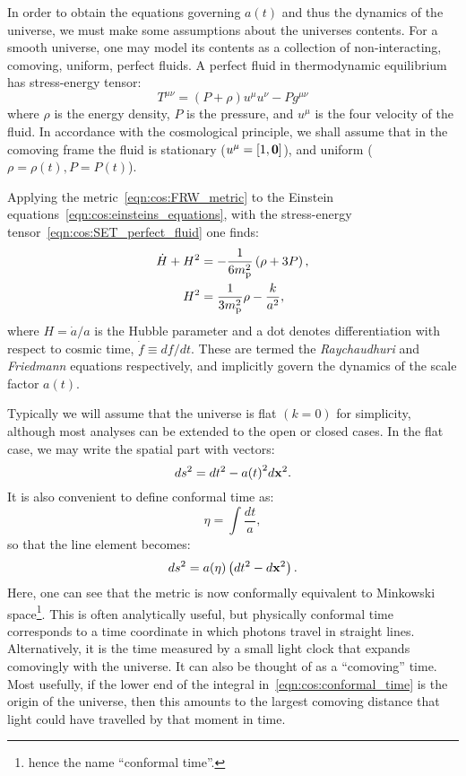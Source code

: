 In order to obtain the equations governing $a(t)$ and thus the dynamics of the universe, we must make some assumptions about the universes contents. For a smooth universe, one may model its contents as a collection of non-interacting, comoving, uniform, perfect fluids. A perfect fluid in thermodynamic equilibrium has stress-energy tensor:
\begin{equation}
  T^{\mu\nu} = (P+\rho)u^{\mu}u^{\nu} - P g^{\mu\nu}
  \label{eqn:cos:SET_perfect_fluid}
\end{equation}
where $\rho$ is the energy density, $P$ is the pressure, and $u^\mu$ is the four velocity of the fluid. In accordance with the cosmological principle, we shall assume that in the comoving frame the fluid is stationary ($u^\mu = [1,\mathbf{0}]$), and uniform ($\rho=\rho(t),P=P(t)$).  

Applying the metric~\eqref{eqn:cos:FRW_metric} to the Einstein equations~\eqref{eqn:cos:einsteins_equations}, with the stress-energy tensor~\eqref{eqn:cos:SET_perfect_fluid} one finds:
\begin{align}
  \dot{H}+H^2 &= 
  -\frac{1}{6m_{\mathrm{p}}^2}\left( \rho + 3P\right), 
  \label{eqn:Raychaudhuri_rho}
  \\
  H^2 &= 
  \frac{1}{3m_{\mathrm{p}}^2}\rho - \frac{k}{a^2}, 
\end{align}
%
where $H=\dot{a}/a$ is the Hubble parameter and a dot denotes differentiation with respect to cosmic time, $\dot{f}\equiv df/dt$. These are termed the {\em Raychaudhuri\/} and {\em Friedmann\/} equations respectively, and implicitly govern the dynamics of the scale factor $a(t)$. 


 Typically we will assume that the universe is flat $(k=0)$ for simplicity, although most analyses can be extended to the open or closed cases. In the flat case, we may write the spatial part with vectors:
\begin{equation}
  ds^2 = dt^2 - a{(t)}^2 d{\mathbf{x}}^2.
  \label{eqn:cos:flat_FRW}
\end{equation}
It is also convenient to define conformal time as:
\begin{equation}
  \eta = \int \frac{dt}{a},
  \label{eqn:cos:conformal_time}
\end{equation}
so that the line element becomes:
\begin{equation}
  ds^2 = a(\eta)\left( dt^2 - d{\mathbf{x}}^2 \right).
  \label{eqn:cos:flat_FRW}
\end{equation}
Here, one can see that the metric is now conformally equivalent to Minkowski space\footnote{hence the name ``conformal time''.}.
This is often analytically useful, but physically conformal time corresponds to a time coordinate in which photons travel in straight lines. Alternatively, it is the time measured by a small light clock that expands comovingly with the universe. It can also be thought of as a ``comoving'' time. Most usefully, if the lower end of the integral in~\eqref{eqn:cos:conformal_time} is the origin of the universe, then this amounts to the largest comoving distance that light could have travelled by that moment in time.
                                                                     
